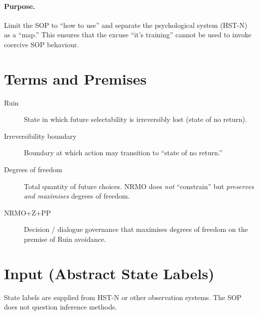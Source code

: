 \paragraph{Purpose.}
Limit the SOP to ``how to use'' and separate the psychological system
(HST-N) as a ``map.'' This ensures that the excuse ``it's training''
cannot be used to invoke coercive SOP behaviour.

\section{Terms and Premises}
\label{sec:sop-os-terms}

\begin{description}
\item[Ruin] State in which future selectability is irreversibly lost
(state of no return).
\item[Irreversibility boundary] Boundary at which action may
transition to ``state of no return.''
\item[Degrees of freedom] Total quantity of future choices. NRMO does
\emph{not} ``constrain'' but \emph{preserves and maximises} degrees
of freedom.
\item[NRMO+Z+PP] Decision / dialogue governance that maximises
degrees of freedom on the premise of Ruin avoidance.
\end{description}


\section{Input (Abstract State Labels)}
\label{sec:sop-os-input}

State labels are supplied from HST-N or other observation systems.
The SOP does not question inference methods.

